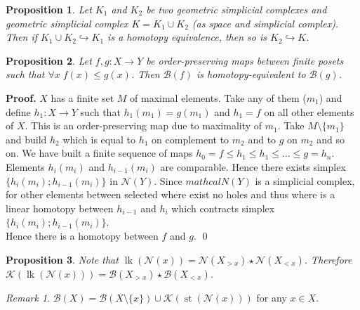 \documentclass[a4paper, 12pt]{article}
\newtheorem{proposition}{Proposition}
\theoremstyle{definition}
\theoremstyle{remark}
\newtheorem{remark}{Remark}
\newenvironment{pf}{\noindent\textbf{Proof.}}{\qed}
\renewcommand{\leq}{\leqslant}
\begin{document}
\begin{proposition} {\cite[Proposition 2.1]{Bar11}}
  Let $K_1$ and $K_2$ be two geometric simplicial complexes and geometric simplicial complex $K = K_1 \cup K_2$ (as space and simplicial complex). Then if $K_1 \cup K_2 \hookrightarrow K_1$ is a homotopy equivalence, then so is $K_2 \hookrightarrow K$.
\end{proposition}

\begin{proposition} {\cite[Proposition 2.2]{Bar11}}
  Let $f,g : X \to Y$ be order-preserving maps between finite posets such that $\forall x\;f(x) \leq g(x)$. Then $\mathcal{B}(f)$ is homotopy-equivalent to $\mathcal{B}(g)$.
\end{proposition}

\begin{pf}
  $X$ has a finite set $M$ of maximal elements. Take any of them ($m_1$) and define $h_1 : X \to Y$ such that $h_1(m_1) = g(m_1)$ and $h_1 = f$ on all other elements of $X$. This is an order-preserving map due to maximality of $m_1$. Take $M \setminus \{m_1\}$ and build $h_2$ which is equal to $h_1$ on complement to $m_2$ and to $g$ on $m_2$ and so on. We have built a finite sequence of maps $h_0 = f \leq h_1 \leq h_1 \leq \ldots \leq g = h_n$.\\

  Elements $h_i(m_i)$ and $h_{i-1}(m_i)$ are comparable. Hence there exists simplex $\{h_i(m_i); h_{i-1}(m_i)\}$ in $\mathcal{N}(Y)$. Since $mathcal{N}(Y)$ is a simplicial complex, for other elements between selected where exist no holes and thus where is a linear homotopy between $h_{i-1}$ and $h_{i}$ which contracts simplex $\{h_i(m_i); h_{i-1}(m_i)\}$.\\

  Hence there is a homotopy between $f$ and $g$.
\end{pf}

\begin{proposition}
  Note that $\operatorname{lk}(\mathcal{N}(x)) = \mathcal{N}(X_{>x}) \star \mathcal{N}(X_{<x})$. Therefore $\mathcal{K}(\operatorname{lk}(\mathcal{N}(x))) = \mathcal{B}(X_{>x}) \star \mathcal{B}(X_{<x})$.
\end{proposition}

\begin{remark}
  $\mathcal{B}(X) = \mathcal{B}(X \setminus \{x\}) \cup \mathcal{K}(\operatorname{st}(\mathcal{N}(x)))$ for any $x \in X$.\\
\end{remark}
\end{document}
